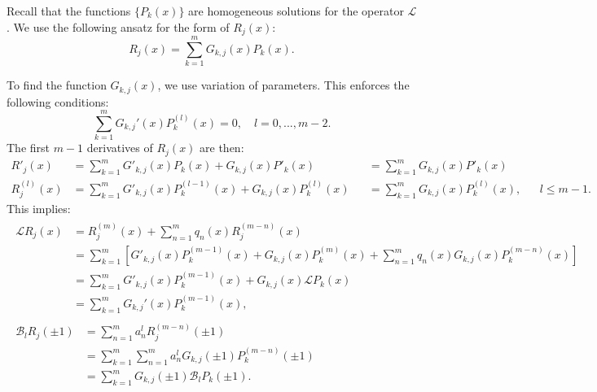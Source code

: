 \documentclass{book}
\begin{document}
Recall that the functions $\{ P_k(x) \}$ are homogeneous solutions for the operator $\mathcal{L}$.
We use the following ansatz for the form of $R_j(x)$:
\begin{equation} \label{ansatz}
R_j(x) = \sum_{k=1}^m G_{k,j}(x) P_k(x) .
\end{equation}

To find the function $G_{k,j}(x)$, we use variation of parameters.
This enforces the following conditions:
\begin{equation} \label{variation of parameters}
\sum_{k=1}^m G_{k,j}'(x) P_k^{(l)}(x) = 0, \quad l = 0,...,m-2 .
\end{equation}
The first $m-1$ derivatives of $R_j(x)$ are then:
\begin{equation}
\begin{aligned}
R'_j(x) & = \sum_{k=1}^m G'_{k,j}(x) P_k(x) + G_{k,j}(x) P'_k(x) && = \sum_{k=1}^m G_{k,j}(x) P'_k(x) \\
R_j^{(l)}(x) & = \sum_{k=1}^m G'_{k,j}(x) P_k^{(l-1)}(x) + G_{k,j}(x) P_k^{(l)}(x) && = \sum_{k=1}^m G_{k,j}(x) P_k^{(l)}(x), && l \leq m-1 .
\end{aligned}
\end{equation}
This implies:
\begin{align} \label{L on R}
\begin{split}
\mathcal{L} R_j(x) & = R_j^{(m)}(x) + \sum_{n=1}^m q_n(x) R_j^{(m-n)}(x) \\
& = \sum_{k=1}^m \left [ G'_{k,j}(x) P_k^{(m-1)}(x) + G_{k,j}(x) P_k^{(m)}(x) + \sum_{n=1}^m q_n(x) G_{k,j}(x) P_k^{(m-n)}(x) \right ] \\
& = \sum_{k=1}^m G'_{k,j}(x) P_k^{(m-1)}(x) + G_{k,j}(x) \mathcal{L} P_k(x) \\
& = \sum_{k=1}^m G_{k,j}'(x) P_k^{(m-1)}(x) ,
\end{split} \\
\begin{split} \label{B on R}
\mathcal{B}_l R_j(\pm 1) & = \sum_{n=1}^m a_n^l R_j^{(m-n)}(\pm1) \\
& = \sum_{k=1}^m \sum_{n=1}^m a_n^l G_{k,j}(\pm1) P_k^{(m-n)}(\pm1) \\
& = \sum_{k=1}^m G_{k,j}(\pm1) \mathcal{B}_l P_k(\pm1) .
\end{split}
\end{align}
\end{document}
